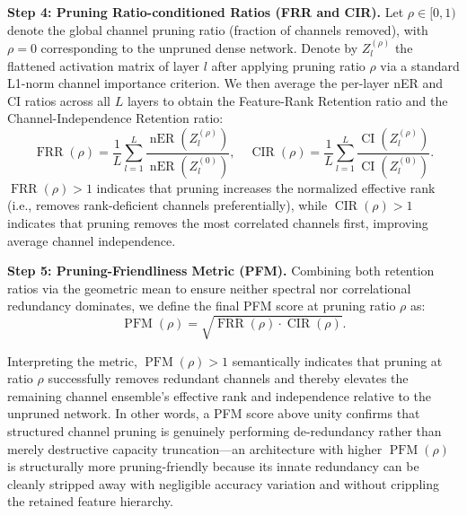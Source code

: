 \documentclass[conference]{IEEEtran}
\begin{document}
\textbf{Step 4: Pruning Ratio-conditioned Ratios (FRR and CIR).} Let $\rho \in [0, 1)$ denote the global channel pruning ratio (fraction of channels removed), with $\rho = 0$ corresponding to the unpruned dense network. Denote by $Z_l^{(\rho)}$ the flattened activation matrix of layer $l$ after applying pruning ratio $\rho$ via a standard L1-norm channel importance criterion. We then average the per-layer nER and CI ratios across all $L$ layers to obtain the Feature-Rank Retention ratio and the Channel-Independence Retention ratio:
\begin{equation}
\operatorname{FRR}(\rho) = \frac{1}{L} \sum_{l=1}^{L} \frac{\operatorname{nER}(Z_l^{(\rho)})}{\operatorname{nER}(Z_l^{(0)})}, \quad
\operatorname{CIR}(\rho) = \frac{1}{L} \sum_{l=1}^{L} \frac{\operatorname{CI}(Z_l^{(\rho)})}{\operatorname{CI}(Z_l^{(0)})}.
\end{equation}
$\operatorname{FRR}(\rho) > 1$ indicates that pruning increases the normalized effective rank (i.e., removes rank-deficient channels preferentially), while $\operatorname{CIR}(\rho) > 1$ indicates that pruning removes the most correlated channels first, improving average channel independence.

\textbf{Step 5: Pruning-Friendliness Metric (PFM).} Combining both retention ratios via the geometric mean to ensure neither spectral nor correlational redundancy dominates, we define the final PFM score at pruning ratio $\rho$ as:
\begin{equation}
\operatorname{PFM}(\rho) = \sqrt{\operatorname{FRR}(\rho) \cdot \operatorname{CIR}(\rho)}.
\end{equation}

Interpreting the metric, $\operatorname{PFM}(\rho) > 1$ semantically indicates that pruning at ratio $\rho$ successfully removes redundant channels and thereby elevates the remaining channel ensemble's effective rank and independence relative to the unpruned network. In other words, a PFM score above unity confirms that structured channel pruning is genuinely performing de-redundancy rather than merely destructive capacity truncation—an architecture with higher $\operatorname{PFM}(\rho)$ is structurally more pruning-friendly because its innate redundancy can be cleanly stripped away with negligible accuracy variation and without crippling the retained feature hierarchy.
\end{document}

